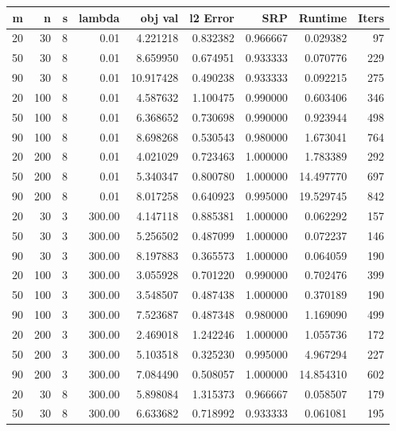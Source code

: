 \begin{tabular}{rrrrrrrrr}
\toprule
 m &   n &  s &  lambda &   obj val &  l2 Error &      SRP &   Runtime &  Iters \\
\midrule
20 &  30 &  8 &    0.01 &  4.221218 &  0.832382 & 0.966667 &  0.029382 &     97 \\
50 &  30 &  8 &    0.01 &  8.659950 &  0.674951 & 0.933333 &  0.070776 &    229 \\
90 &  30 &  8 &    0.01 & 10.917428 &  0.490238 & 0.933333 &  0.092215 &    275 \\
20 & 100 &  8 &    0.01 &  4.587632 &  1.100475 & 0.990000 &  0.603406 &    346 \\
50 & 100 &  8 &    0.01 &  6.368652 &  0.730698 & 0.990000 &  0.923944 &    498 \\
90 & 100 &  8 &    0.01 &  8.698268 &  0.530543 & 0.980000 &  1.673041 &    764 \\
20 & 200 &  8 &    0.01 &  4.021029 &  0.723463 & 1.000000 &  1.783389 &    292 \\
50 & 200 &  8 &    0.01 &  5.340347 &  0.800780 & 1.000000 & 14.497770 &    697 \\
90 & 200 &  8 &    0.01 &  8.017258 &  0.640923 & 0.995000 & 19.529745 &    842 \\
20 &  30 &  3 &  300.00 &  4.147118 &  0.885381 & 1.000000 &  0.062292 &    157 \\
50 &  30 &  3 &  300.00 &  5.256502 &  0.487099 & 1.000000 &  0.072237 &    146 \\
90 &  30 &  3 &  300.00 &  8.197883 &  0.365573 & 1.000000 &  0.064059 &    190 \\
20 & 100 &  3 &  300.00 &  3.055928 &  0.701220 & 0.990000 &  0.702476 &    399 \\
50 & 100 &  3 &  300.00 &  3.548507 &  0.487438 & 1.000000 &  0.370189 &    190 \\
90 & 100 &  3 &  300.00 &  7.523687 &  0.487348 & 0.980000 &  1.169090 &    499 \\
20 & 200 &  3 &  300.00 &  2.469018 &  1.242246 & 1.000000 &  1.055736 &    172 \\
50 & 200 &  3 &  300.00 &  5.103518 &  0.325230 & 0.995000 &  4.967294 &    227 \\
90 & 200 &  3 &  300.00 &  7.084490 &  0.508057 & 1.000000 & 14.854310 &    602 \\
20 &  30 &  8 &  300.00 &  5.898084 &  1.315373 & 0.966667 &  0.058507 &    179 \\
50 &  30 &  8 &  300.00 &  6.633682 &  0.718992 & 0.933333 &  0.061081 &    195 \\

\end{tabular}
